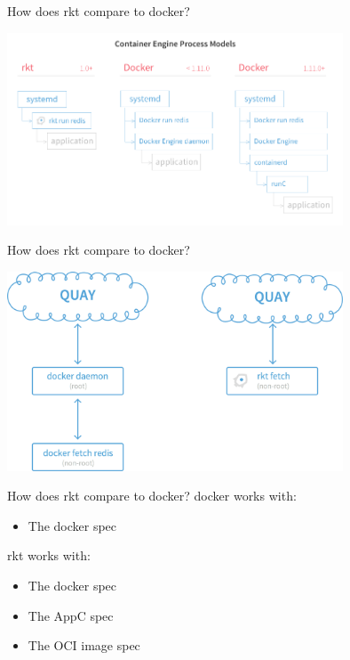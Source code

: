 \documentclass[pdf,aspectratio=169,14pt]{beamer}
\begin{document}
\begin{frame}{How does rkt compare to docker?}
    \begin{center}
        \includegraphics[width=0.75\textwidth]{rkt-vs-docker-process-model}
    \end{center}
\end{frame}

\begin{frame}{How does rkt compare to docker?}
    \begin{center}
        \includegraphics[width=0.75\textwidth]{rkt-vs-docker-fetch}
    \end{center}
\end{frame}

\begin{frame}{How does rkt compare to docker?}
    docker works with:
    \begin{itemize}
        \item The docker spec
    \end{itemize}
    \pause
    \vspace{1em}
    rkt works with:
    \begin{itemize}
        \item The docker spec
        \item The AppC spec
        \item The OCI image spec
    \end{itemize}
\end{frame}
\end{document}
